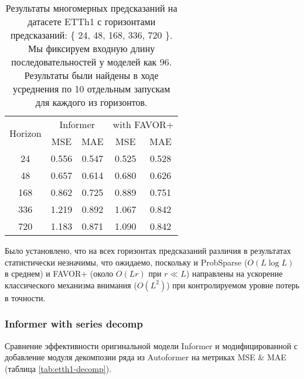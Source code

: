 \begin{table}[!ht]
    \centering
    \begin{tabular}{c  cc  cc}
    \toprule
    \multirow{2}{*}{{Horizon}} 
      & \multicolumn{2}{c}{{Informer}} 
      & \multicolumn{2}{c}{with FAVOR+} \\
    \cmidrule(lr){2-3} \cmidrule(lr){4-5}
      & {MSE} & {MAE} 
      & {MSE} & {MAE} \\
    \midrule
    24   & 0.556 & 0.547 & 0.525 & 0.528 \\
    48   & 0.657 & 0.614 & 0.680 & 0.626 \\
    168  & 0.862 & 0.725 & 0.889 & 0.751 \\
    336  & 1.219 & 0.892 & 1.067 & 0.842 \\
    720  & 1.183 & 0.871 & 1.090 & 0.842 \\
    \bottomrule
    \end{tabular}
    \caption{Результаты многомерных предсказаний на датасете ETTh1 с 
    горизонтами предсказаний: \{ 24, 48, 168, 336, 720 \}. 
    Мы фиксируем входную длину последовательностей у моделей как 96.
    Результаты были найдены в ходе усреднения по 10 отдельным запускам 
    для каждого из горизонтов.}
    \label{tab:etth1-favor}
\end{table}

Было установлено, что на всех горизонтах предсказаний различия в результатах 
статистически незначимы, что ожидаемо, поскольку и ProbSparse ($O(L \log L)$ в среднем) 
и FAVOR+ (около $O(Lr)$ при $r \ll L$) направлены на ускорение классического механизма 
внимания ($O(L^2)$) при контролируемом уровне потерь в точности.

\subsubsection{Informer with series decomp}

Сравнение эффективности оригинальной модели Informer и модифицированной
с добавление модуля декомпозии ряда из Autoformer 
на метриках MSE \& MAE (таблица \ref{tab:etth1-decomp}).

